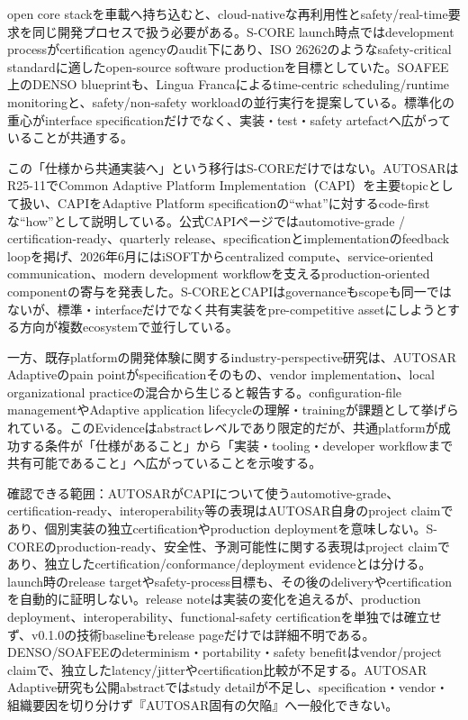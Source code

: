 \begin{surveyarticlebody}
open core stackを車載へ持ち込むと、cloud-nativeな再利用性とsafety/real-time要求を同じ開発プロセスで扱う必要がある。S-CORE launch時点ではdevelopment processがcertification agencyのaudit下にあり、ISO 26262のようなsafety-critical standardに適したopen-source software productionを目標としていた。SOAFEE上のDENSO blueprintも、Lingua Francaによるtime-centric scheduling/runtime monitoringと、safety/non-safety workloadの並行実行を提案している。標準化の重心がinterface specificationだけでなく、実装・test・safety artefactへ広がっていることが共通する。\autocite{src-2f548bd2c797,src-eac8b3c725a2}

この「仕様から共通実装へ」という移行はS-COREだけではない。AUTOSARはR25-11でCommon Adaptive Platform Implementation（CAPI）を主要topicとして扱い、CAPIをAdaptive Platform specificationの``what''に対するcode-firstな``how''として説明している。公式CAPIページではautomotive-grade / certification-ready、quarterly release、specificationとimplementationのfeedback loopを掲げ、2026年6月にはiSOFTからcentralized compute、service-oriented communication、modern development workflowを支えるproduction-oriented componentの寄与を発表した。S-COREとCAPIはgovernanceもscopeも同一ではないが、標準・interfaceだけでなく共有実装をpre-competitive assetにしようとする方向が複数ecosystemで並行している。\autocite{src-3679c0c0bec5,src-ec70559f8987,src-f1ba3a884bb8}

一方、既存platformの開発体験に関するindustry-perspective研究は、AUTOSAR Adaptiveのpain pointがspecificationそのもの、vendor implementation、local organizational practiceの混合から生じると報告する。configuration-file managementやAdaptive application lifecycleの理解・trainingが課題として挙げられている。このEvidenceはabstractレベルであり限定的だが、共通platformが成功する条件が「仕様があること」から「実装・tooling・developer workflowまで共有可能であること」へ広がっていることを示唆する。\autocite{src-57d332ab5356}
\end{surveyarticlebody}

\begin{claimboundary}
確認できる範囲：AUTOSARがCAPIについて使うautomotive-grade、certification-ready、interoperability等の表現はAUTOSAR自身のproject claimであり、個別実装の独立certificationやproduction deploymentを意味しない。S-COREのproduction-ready、安全性、予測可能性に関する表現はproject claimであり、独立したcertification/conformance/deployment evidenceとは分ける。launch時のrelease targetやsafety-process目標も、その後のdeliveryやcertificationを自動的に証明しない。release noteは実装の変化を追えるが、production deployment、interoperability、functional-safety certificationを単独では確立せず、v0.1.0の技術baselineもrelease pageだけでは詳細不明である。DENSO/SOAFEEのdeterminism・portability・safety benefitはvendor/project claimで、独立したlatency/jitterやcertification比較が不足する。AUTOSAR Adaptive研究も公開abstractではstudy detailが不足し、specification・vendor・組織要因を切り分けず『AUTOSAR固有の欠陥』へ一般化できない。\autocite{src-1857c9466d46,src-2f548bd2c797,src-315ed9fdbb11,src-57d332ab5356,src-5ae1a99f6a86,src-7aa0d4da204c,src-b89108e03021,src-d63061aaba8e,src-df5a66eed297,src-eac8b3c725a2,src-fa6bfa6f142c}
\end{claimboundary}

